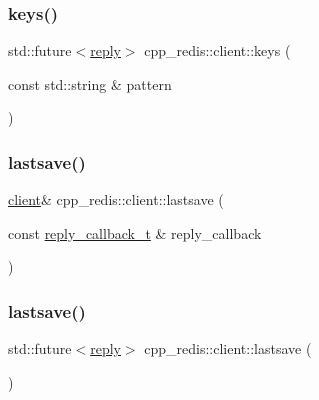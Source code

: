 \mbox{\label{classcpp__redis_1_1client_a1c0804cab9251acde742e725d0af6cbf}} 
\subsubsection{\texorpdfstring{keys()}{keys()}\hspace{0.1cm}{\footnotesize\ttfamily [2/2]}}
{\footnotesize\ttfamily std\+::future$<$\hyperlink{classcpp__redis_1_1reply}{reply}$>$ cpp\+\_\+redis\+::client\+::keys (\begin{DoxyParamCaption}\item[{const std\+::string \&}]{pattern }\end{DoxyParamCaption})}

\mbox{\label{classcpp__redis_1_1client_a3b25eaf2691051156748abb69e1b0317}} 
\subsubsection{\texorpdfstring{lastsave()}{lastsave()}\hspace{0.1cm}{\footnotesize\ttfamily [1/2]}}
{\footnotesize\ttfamily \hyperlink{classcpp__redis_1_1client}{client}\& cpp\+\_\+redis\+::client\+::lastsave (\begin{DoxyParamCaption}\item[{const \hyperlink{classcpp__redis_1_1client_a061a1140d36d2eaeda82b09a0bb3f9f2}{reply\+\_\+callback\+\_\+t} \&}]{reply\+\_\+callback }\end{DoxyParamCaption})}

\mbox{\label{classcpp__redis_1_1client_a6b550a4ecf6eb33abffd664c3124b4f9}} 
\subsubsection{\texorpdfstring{lastsave()}{lastsave()}\hspace{0.1cm}{\footnotesize\ttfamily [2/2]}}
{\footnotesize\ttfamily std\+::future$<$\hyperlink{classcpp__redis_1_1reply}{reply}$>$ cpp\+\_\+redis\+::client\+::lastsave (\begin{DoxyParamCaption}{ }\end{DoxyParamCaption})}

